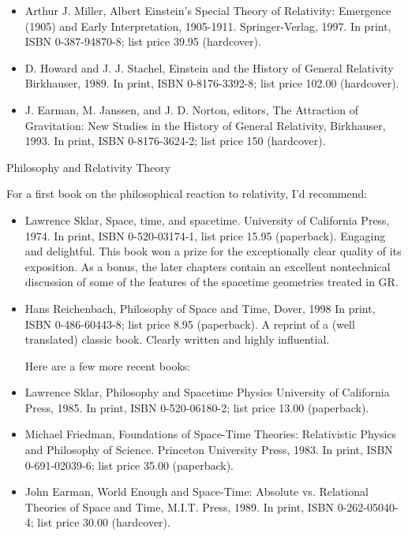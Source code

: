 \documentclass[10pt,a4paper]{book}
\theoremstyle{definition}
\begin{document}
\begin{itemize}
\item Arthur J. Miller,
Albert Einstein's Special Theory of Relativity: Emergence (1905) and Early Interpretation, 1905-1911.
Springer-Verlag, 1997.
In print, ISBN 0-387-94870-8; list price 39.95 (hardcover).

\item D. Howard and J. J. Stachel,
Einstein and the History of General Relativity
Birkhauser, 1989.
In print, ISBN 0-8176-3392-8; list price 102.00 (hardcover).

\item J. Earman, M. Janssen, and J. D. Norton, editors,
The Attraction of Gravitation: New Studies in the History of General Relativity,
Birkhauser, 1993.
In print, ISBN 0-8176-3624-2; list price 150 (hardcover).
\end{itemize}

Philosophy and Relativity Theory

For a first book on the philosophical reaction to relativity, I'd recommend:

\begin{itemize}
\item Lawrence Sklar,
Space, time, and spacetime.
University of California Press, 1974.
In print, ISBN 0-520-03174-1, list price 15.95 (paperback).
Engaging and delightful.  This book won a prize for the exceptionally clear quality of its exposition.  As a bonus, the later chapters contain an excellent nontechnical discussion of some of the features of the spacetime geometries treated in GR.

\item Hans Reichenbach,
Philosophy of Space and Time,
Dover, 1998
In print, ISBN 0-486-60443-8; list price 8.95 (paperback).
A reprint of a (well translated) classic book.  Clearly written and highly influential.

Here are a few more recent books:

\item Lawrence Sklar,
Philosophy and Spacetime Physics
University of California Press, 1985.
In print, ISBN 0-520-06180-2; list price 13.00 (paperback).
\item Michael Friedman,
Foundations of Space-Time Theories: Relativistic Physics and Philosophy of Science.
Princeton University Press, 1983.
In print, ISBN 0-691-02039-6; list price 35.00 (paperback).
\item John Earman,
World Enough and Space-Time: Absolute vs. Relational Theories of Space and Time,
M.I.T. Press, 1989.
In print, ISBN 0-262-05040-4; list price 30.00 (hardcover).
\end{itemize}
\end{document}
